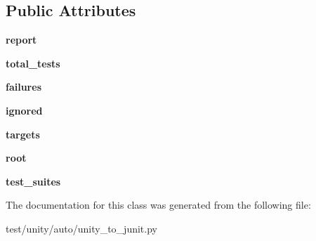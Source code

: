 \subsection*{Public Attributes}
\begin{DoxyCompactItemize}
\item 
\mbox{\label{classunity__to__junit_1_1UnityTestSummary_af238e0e3f19b3843e37d36980377ed24}} 
{\bfseries report}
\item 
\mbox{\label{classunity__to__junit_1_1UnityTestSummary_a8af33e4fc6faed23b2a7035121a855e5}} 
{\bfseries total\+\_\+tests}
\item 
\mbox{\label{classunity__to__junit_1_1UnityTestSummary_aa81410197141a91aeb663058c0c77fcb}} 
{\bfseries failures}
\item 
\mbox{\label{classunity__to__junit_1_1UnityTestSummary_a2098fb414a6325f8caa816b6b7fe2f4d}} 
{\bfseries ignored}
\item 
\mbox{\label{classunity__to__junit_1_1UnityTestSummary_a6d9d8a1b4a93d9ed2b0d9d86408f190c}} 
{\bfseries targets}
\item 
\mbox{\label{classunity__to__junit_1_1UnityTestSummary_a4784068dcc7cfacf63c95bf8bde05a3e}} 
{\bfseries root}
\item 
\mbox{\label{classunity__to__junit_1_1UnityTestSummary_ae73ffcabd682b592454f35c230de4bf1}} 
{\bfseries test\+\_\+suites}
\end{DoxyCompactItemize}


The documentation for this class was generated from the following file\+:\begin{DoxyCompactItemize}
\item 
test/unity/auto/unity\+\_\+to\+\_\+junit.\+py\end{DoxyCompactItemize}
